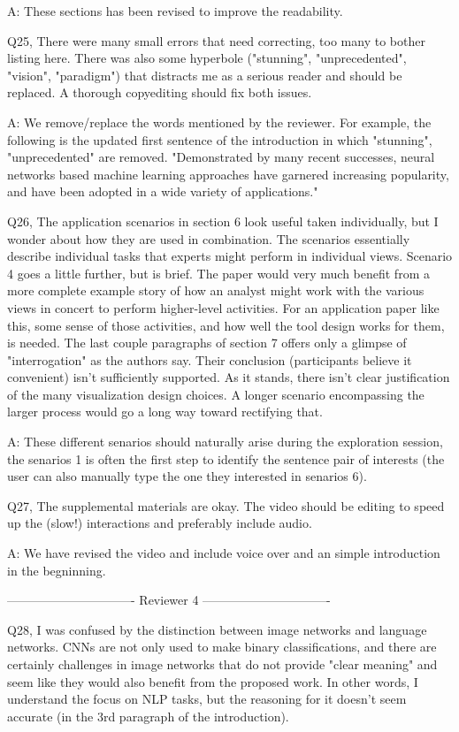 A: These sections has been revised to improve the readability.

Q25, There were many small errors that need correcting, too many to bother listing here. There was also some hyperbole ("stunning", "unprecedented", "vision", "paradigm") that distracts me as a serious reader and should be replaced. A thorough copyediting should fix both issues.

A: We remove/replace the words mentioned by the reviewer. For example, the following is the updated first sentence of the introduction in which "stunning", "unprecedented" are removed. "Demonstrated by many recent successes, neural networks based machine learning approaches have garnered increasing popularity, and have been adopted in a wide variety of applications."


Q26, The application scenarios in section 6 look useful taken individually, but I wonder about how they are used in combination. The scenarios essentially describe individual tasks that experts might perform in individual views. Scenario 4 goes a little further, but is brief. The paper would very much benefit from a more complete example story of how an analyst might work with the various views in concert to perform higher-level activities. For an application paper like this, some sense of those activities, and how well the tool design works for them, is needed. The last couple paragraphs of section 7 offers only a glimpse of "interrogation" as the authors say.
Their conclusion (participants believe it convenient) isn't sufficiently supported. As it stands, there isn't clear justification of the many visualization design choices. A longer scenario encompassing the larger process would go a long way toward rectifying that.

A: These different senarios should naturally arise during the exploration session, the senarios 1 is often the first step to identify the sentence pair of interests (the user can also manually type the one they interested in senarios 6).

Q27, The supplemental materials are okay. The video should be editing to speed up the (slow!) interactions and preferably include audio.

A: We have revised the video and include voice over and an simple introduction in the begninning.


------------------------------- Reviewer 4 -------------------------------

Q28, I was confused by the distinction between image networks and language networks. CNNs are not only used to make binary classifications, and there are certainly challenges in image networks that do not provide "clear meaning" and seem like they would also benefit from the proposed work. In other words, I understand the focus on NLP tasks, but the reasoning for it doesn't seem accurate (in the 3rd paragraph of the introduction).

